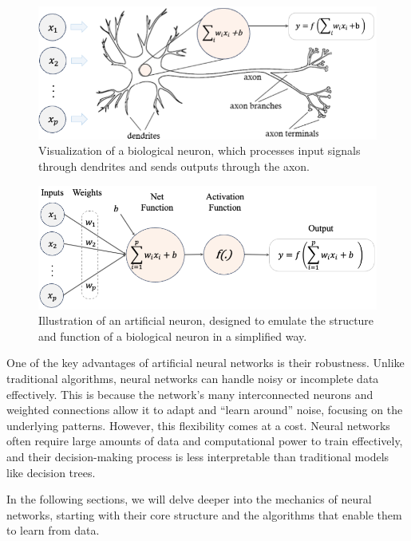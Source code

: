 \documentclass[
]{book}
\theoremstyle{definition}
\theoremstyle{definition}
\theoremstyle{definition}
\theoremstyle{definition}
\theoremstyle{remark}
\begin{document}
\begin{figure}

{\centering \includegraphics[width=0.75\linewidth]{images/net_brain} 

}

\caption{Visualization of a biological neuron, which processes input signals through dendrites and sends outputs through the axon.}\label{fig:net-brain}
\end{figure}

\begin{figure}

{\centering \includegraphics[width=0.9\linewidth]{images/net_1} 

}

\caption{Illustration of an artificial neuron, designed to emulate the structure and function of a biological neuron in a simplified way.}\label{fig:net-1}
\end{figure}

One of the key advantages of artificial neural networks is their robustness. Unlike traditional algorithms, neural networks can handle noisy or incomplete data effectively. This is because the network's many interconnected neurons and weighted connections allow it to adapt and ``learn around'' noise, focusing on the underlying patterns. However, this flexibility comes at a cost. Neural networks often require large amounts of data and computational power to train effectively, and their decision-making process is less interpretable than traditional models like decision trees.

In the following sections, we will delve deeper into the mechanics of neural networks, starting with their core structure and the algorithms that enable them to learn from data.
\end{document}

